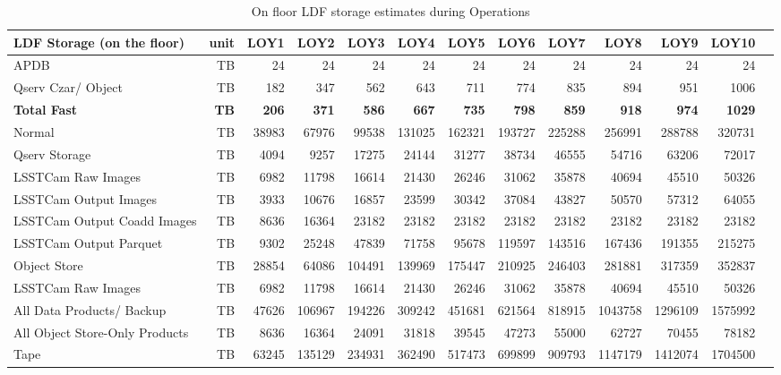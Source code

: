 \tiny \begin{longtable} { |p{}  |r  |r  |r  |r  |r  |r  |r  |r  |r  |r  |r  |r |} 
\caption{On floor LDF storage estimates during Operations
 \label{tab:storageFloorOps}}\\ 
\hline 
\textbf{LDF Storage (on the floor)}&\textbf{unit}&\textbf{LOY1}&\textbf{LOY2}&\textbf{LOY3}&\textbf{LOY4}&\textbf{LOY5}&\textbf{LOY6}&\textbf{LOY7}&\textbf{LOY8}&\textbf{LOY9}&\textbf{LOY10} \\ \hline
{APDB}&{TB}&{24}&{24}&{24}&{24}&{24}&{24}&{24}&{24}&{24}&{24} \\ \hline
{Qserv Czar/ Object}&{TB}&{182}&{347}&{562}&{643}&{711}&{774}&{835}&{894}&{951}&{1006} \\ \hline
\textbf{Total Fast}&\textbf{TB}&\textbf{206}&\textbf{371}&\textbf{586}&\textbf{667}&\textbf{735}&\textbf{798}&\textbf{859}&\textbf{918}&\textbf{974}&\textbf{1029} \\ \hline
{Normal}&{TB}&{38983}&{67976}&{99538}&{131025}&{162321}&{193727}&{225288}&{256991}&{288788}&{320731} \\ \hline
{Qserv Storage}&{TB}&{4094}&{9257}&{17275}&{24144}&{31277}&{38734}&{46555}&{54716}&{63206}&{72017} \\ \hline
{LSSTCam Raw Images}&{TB}&{6982}&{11798}&{16614}&{21430}&{26246}&{31062}&{35878}&{40694}&{45510}&{50326} \\ \hline
{LSSTCam Output Images}&{TB}&{3933}&{10676}&{16857}&{23599}&{30342}&{37084}&{43827}&{50570}&{57312}&{64055} \\ \hline
{LSSTCam Output Coadd Images}&{TB}&{8636}&{16364}&{23182}&{23182}&{23182}&{23182}&{23182}&{23182}&{23182}&{23182} \\ \hline
{LSSTCam Output Parquet}&{TB}&{9302}&{25248}&{47839}&{71758}&{95678}&{119597}&{143516}&{167436}&{191355}&{215275} \\ \hline
{Object Store}&{TB}&{28854}&{64086}&{104491}&{139969}&{175447}&{210925}&{246403}&{281881}&{317359}&{352837} \\ \hline
{LSSTCam Raw Images}&{TB}&{6982}&{11798}&{16614}&{21430}&{26246}&{31062}&{35878}&{40694}&{45510}&{50326} \\ \hline
{All Data Products/ Backup}&{TB}&{47626}&{106967}&{194226}&{309242}&{451681}&{621564}&{818915}&{1043758}&{1296109}&{1575992} \\ \hline
{All Object Store-Only Products}&{TB}&{8636}&{16364}&{24091}&{31818}&{39545}&{47273}&{55000}&{62727}&{70455}&{78182} \\ \hline
{Tape}&{TB}&{63245}&{135129}&{234931}&{362490}&{517473}&{699899}&{909793}&{1147179}&{1412074}&{1704500} \\ \hline
\end{longtable} \normalsize
